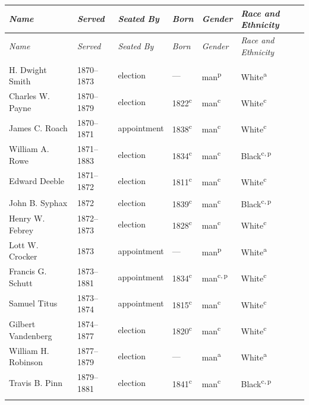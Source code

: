 \begin{longtable}{Q}
\toprule \textit{Name} & \textit{Served} & \textit{Seated By} & \textit{Born} & \textit{Gender} & \textit{Race and Ethnicity} \\ \midrule \endfirsthead
\toprule \textit{Name} & \textit{Served} & \textit{Seated By} & \textit{Born} & \textit{Gender} & \textit{Race and Ethnicity} \\ \midrule \endhead
\bottomrule \endfoot
{} \\*
H. Dwight Smith & 1870--1873 & election & --- & man\textsuperscript{p} & White\textsuperscript{a} \\*
Charles W. Payne & 1870--1879 & election & 1822\textsuperscript{c} & man\textsuperscript{c} & White\textsuperscript{c} \\
James C. Roach & 1870--1871 & appointment & 1838\textsuperscript{c} & man\textsuperscript{c} & White\textsuperscript{c} \\
William A. Rowe & 1871--1883 & election & 1834\textsuperscript{c} & man\textsuperscript{c} & Black\textsuperscript{c,\,p} \\
Edward Deeble & 1871--1872 & election & 1811\textsuperscript{c} & man\textsuperscript{c} & White\textsuperscript{c} \\
John B. Syphax & 1872 & election & 1839\textsuperscript{c} & man\textsuperscript{c} & Black\textsuperscript{c,\,p} \\
Henry W. Febrey & 1872--1873 & election & 1828\textsuperscript{c} & man\textsuperscript{c} & White\textsuperscript{c} \\
Lott W. Crocker & 1873 & appointment & --- & man\textsuperscript{p} & White\textsuperscript{a} \\
Francis G. Schutt & 1873--1881 & appointment & 1834\textsuperscript{c} & man\textsuperscript{c,\,p} & White\textsuperscript{c} \\
Samuel Titus & 1873--1874 & appointment & 1815\textsuperscript{c} & man\textsuperscript{c} & White\textsuperscript{c} \\
Gilbert Vandenberg & 1874--1877 & election & 1820\textsuperscript{c} & man\textsuperscript{c} & White\textsuperscript{c} \\
William H. Robinson & 1877--1879 & election & --- & man\textsuperscript{a} & White\textsuperscript{a} \\*
Travis B. Pinn & 1879--1881 & election & 1841\textsuperscript{c} & man\textsuperscript{c} & Black\textsuperscript{c,\,p} \\
\addlinespace[1.4ex]

\end{longtable}
